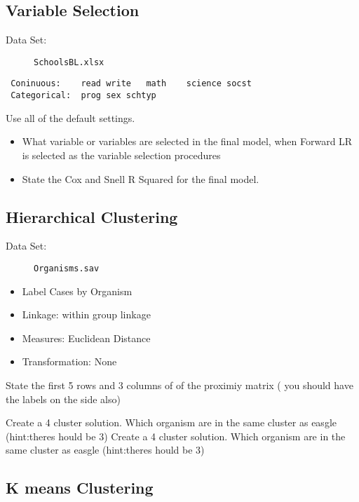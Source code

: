 \documentclass[12pt, a4paper]{article}
\theoremstyle{plain}
\theoremstyle{definition}
\theoremstyle{remark}
\begin{document}
\subsection{Variable Selection}
\begin{description}
\item[Data Set:] \texttt{SchoolsBL.xlsx}
\end{description}
\begin{framed}
\begin{verbatim}
 Coninuous:    read	write	math	science	socst
 Categorical:  prog	sex	schtyp 
\end{verbatim}
\end{framed}

Use all of the default settings.
\begin{itemize}
\item
What variable or variables are selected in the final model, when Forward LR is selected as the variable 
selection procedures
\item 
State the Cox and Snell R Squared for the final model.
\end{itemize}
\newpage
\subsection{Hierarchical Clustering}
\begin{description}
\item[Data Set:] \texttt{Organisms.sav}
\end{description}
\settings

\begin{itemize}
\item Label Cases by Organism
\item Linkage: within group linkage
\item Measures: Euclidean Distance
\item Transformation: None
\end{itemize}

State the first 5 rows and 3 columns of of the proximiy matrix
( you should have the labels on the side also)

Create a 4 cluster solution. Which organism are in the same cluster as easgle (hint:theres hould be 3)
Create a 4 cluster solution. Which organism are in the same cluster as easgle (hint:theres hould be 3)

\newpage
\subsection{K means Clustering}
\end{document}
